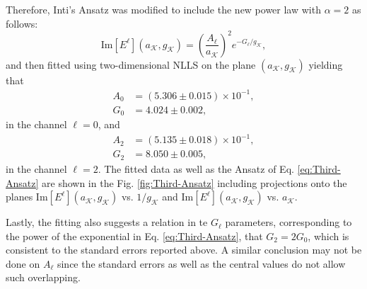 \documentclass[english,aps,prd,nofootinbib,twocolumn]{revtex4-1}
\begin{document}
Therefore, Inti's Ansatz was modified to include the new power law with $\alpha=2$ as follows:
\begin{equation}
\label{eq:Third-Ansatz}
\mathrm{Im}[E^{\ell}](a_{\mathcal{K}},g_{\mathcal{K}}) = 
\left(\frac{A_{\ell}}{a_{\mathcal{K}}} \right)^{2}
e^{-G_{\ell}/g_{\mathcal{K}}},
\end{equation}
and then fitted using two-dimensional NLLS on the plane $(a_{\mathcal{K}}, g_{\mathcal{K}})$ yielding that
\begin{equation}
\begin{split}
A_{0} &= (5.306\pm 0.015)\times 10^{-1},	\\
G_{0} &= 4.024\pm 0.002,
\end{split}
\end{equation}
in the channel $\ell=0$, and 
\begin{equation}
\begin{split}
A_{2} &= (5.135\pm 0.018)\times 10^{-1},	\\
G_{2} &= 8.050\pm 0.005,
\end{split}
\end{equation}
in the channel $\ell=2$. The fitted data as well as the Ansatz of Eq. \eqref{eq:Third-Ansatz} are shown in the Fig. \ref{fig:Third-Ansatz} including projections onto the planes $\mathrm{Im}[E^{\ell}](a_{\mathcal{K}},g_{\mathcal{K}})$  vs. $1/g_{\mathcal{K}}$ and $\mathrm{Im}[E^{\ell}](a_{\mathcal{K}},g_{\mathcal{K}})$ vs. $a_{\mathcal{K}}$. 

Lastly, the fitting also suggests a relation in te $G_{\ell}$ parameters, corresponding to the power of the exponential in Eq. \eqref{eq:Third-Ansatz}, that $G_{2}=2G_{0}$, which is consistent to the standard errors reported above. A similar conclusion may not be done on $A_{\ell}$ since the standard errors as well as the central values do not allow such overlapping. 
\end{document}
